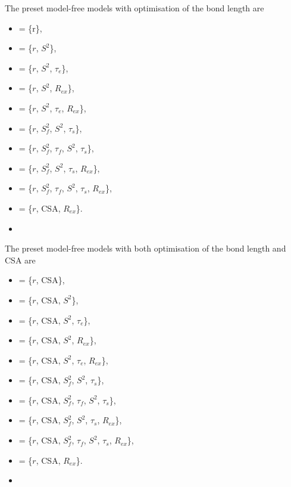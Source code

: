 The preset model-free models with optimisation of the bond length are 
  

 \begin{itemize} 
 \item[]  = \{r\},  
 \item[]  = \{$r$, $S^2$\},  
 \item[]  = \{$r$, $S^2$, $\tau_e$\},  
 \item[]  = \{$r$, $S^2$, $R_{ex}$\},  
 \item[]  = \{$r$, $S^2$, $\tau_e$, $R_{ex}$\},  
 \item[]  = \{$r$, $S^2_f$, $S^2$, $\tau_s$\},  
 \item[]  = \{$r$, $S^2_f$, $\tau_f$, $S^2$, $\tau_s$\},  
 \item[]  = \{$r$, $S^2_f$, $S^2$, $\tau_s$, $R_{ex}$\},  
 \item[]  = \{$r$, $S^2_f$, $\tau_f$, $S^2$, $\tau_s$, $R_{ex}$\},  
 \item[]  = \{$r$, CSA, $R_{ex}$\}.  
 \item[]  
 \end{itemize} 
  

 The preset model-free models with both optimisation of the bond length and CSA are 
  

 \begin{itemize} 
 \item[]  = \{$r$, CSA\},  
 \item[]  = \{$r$, CSA, $S^2$\},  
 \item[]  = \{$r$, CSA, $S^2$, $\tau_e$\},  
 \item[]  = \{$r$, CSA, $S^2$, $R_{ex}$\},  
 \item[]  = \{$r$, CSA, $S^2$, $\tau_e$, $R_{ex}$\},  
 \item[]  = \{$r$, CSA, $S^2_f$, $S^2$, $\tau_s$\},  
 \item[]  = \{$r$, CSA, $S^2_f$, $\tau_f$, $S^2$, $\tau_s$\},  
 \item[]  = \{$r$, CSA, $S^2_f$, $S^2$, $\tau_s$, $R_{ex}$\},  
 \item[]  = \{$r$, CSA, $S^2_f$, $\tau_f$, $S^2$, $\tau_s$, $R_{ex}$\},  
 \item[]  = \{$r$, CSA, $R_{ex}$\}.  
 \item[]  
 \end{itemize} 
  

